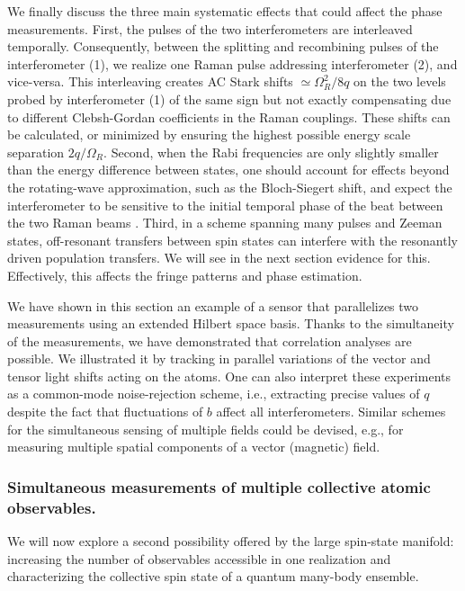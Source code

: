 We finally discuss the three main systematic effects that could affect the phase measurements. 
First, the pulses of the two interferometers are interleaved temporally. Consequently, between the splitting and recombining pulses of the interferometer (1), we realize one Raman pulse addressing interferometer (2), and vice-versa. This interleaving creates AC Stark shifts $\simeq \Omega_R^2/8q$ on the two levels probed by interferometer (1) of the same sign but not exactly compensating due to different Clebsh-Gordan coefficients in the Raman couplings. These shifts can be calculated, or minimized by ensuring the highest possible energy scale separation $2q/\Omega_R$. Second, when the Rabi frequencies are only slightly smaller than the energy difference between states, one should account for effects beyond the rotating-wave approximation, such as the Bloch-Siegert shift, and expect the interferometer to be sensitive to the initial temporal phase of the beat between the two Raman beams \cite{Bidinosti2022gat}. Third, in a scheme spanning many pulses and Zeeman states, off-resonant transfers between spin states can interfere with the resonantly driven population transfers. We will see in the next section evidence for this. Effectively, this affects the fringe patterns and phase estimation.

We have shown in this section an example of a sensor that parallelizes two measurements using an extended Hilbert space basis. Thanks to the simultaneity of the measurements, we have demonstrated that correlation analyses are possible. We illustrated it by tracking in parallel variations of the vector and tensor light shifts acting on the atoms. One can also interpret these experiments as a common-mode noise-rejection scheme, i.e., extracting precise values of $q$ despite the fact that fluctuations of $b$ affect all interferometers. Similar schemes for the simultaneous sensing of multiple fields could be devised, e.g., for measuring multiple spatial components of a vector (magnetic) field. 


\subsubsection{Simultaneous measurements of multiple collective atomic observables.}
\label{SubSec:SimultMeasurementObservables}

We will now explore a second possibility offered by the large spin-state manifold: increasing the number of observables accessible in one realization and characterizing the collective spin state of a quantum many-body ensemble. 

